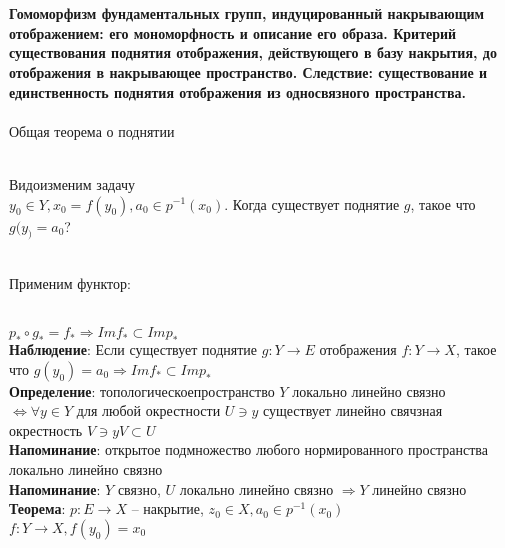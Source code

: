 	\section{}
	\textbf{Гомоморфизм фундаментальных групп, индуцированный накрывающим отображением: его мономорфность и описание его образа. Критерий существования поднятия отображения, действующего в базу накрытия, до отображения в накрывающее пространство. Следствие: существование и единственность поднятия отображения из односвязного пространства.
}\\
	\\	
	Общая теорема о поднятии\\
	\begin{figure}[h]
	\end{figure}\\
	Видоизменим задачу\\
	$y_0 \in Y, x_0 = f(y_0), a_0 \in p^{-1} (x_0)$. Когда существует поднятие $g$, такое что $g(y_) = a_0$?\\
	\begin{figure}[h]
	\end{figure}\\
	Применим функтор:\\
	\begin{figure}[h]
	\end{figure}\\
	$p_{\ast} \circ g_{\ast} = f_{\ast} \Rightarrow Im f_{\ast} \subset Im p_{\ast}$\\
	\textbf{Наблюдение}: Если существует поднятие $g: Y\rightarrow E$ отображения $f: Y\rightarrow X$, такое что $g(y_0) = a_0 \Rightarrow Im f_{\ast} \subset Im p_{\ast}$\\
	\textbf{Определение}: топологическоепространство $Y$ локально линейно связно $\Leftrightarrow \forall y\in Y$ для любой окрестности $U\ni y$ существует линейно свячзная окрестность $V\ni y V\subset U$\\
	\textbf{Напоминание}: открытое подмножество любого нормированного пространства локально линейно связно\\
	\textbf{Напоминание}: $Y$ связно, $U$ локально линейно связно $\Rightarrow Y$ линейно связно\\
	\textbf{Теорема}: $p: E\rightarrow X$ -- накрытие, $z_0 \in X, a_0 \in p^{-1} (x_0)$\\
	$f: Y \rightarrow X, f(y_0) = x_0$\\
